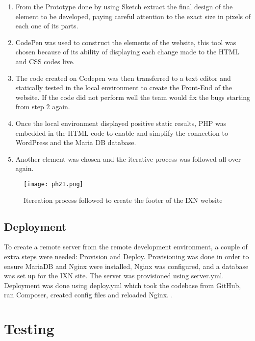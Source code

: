 \documentclass[fontsize=11pt]{extarticle}
\numberwithin{figure}{section} %
\begin{document}
\begin{enumerate}

\item
  From the Prototype done by using Sketch extract the final design of
  the element to be developed, paying careful attention to the exact
  size in pixels of each one of its parts.
\item
  CodePen was used to construct the elements of the website, this tool
  was chosen because of its ability of displaying each change made to
  the HTML and CSS codes live.\\
\item
  The code created on Codepen was then transferred to a text editor and
  statically tested in the local environment to create the Front-End of
  the website. If the code did not perform well the team would fix the
  bugs starting from step 2 again.
\item
  Once the local environment displayed positive static results, PHP was
  embedded in the HTML code to enable and simplify the connection to
  WordPress and the Maria DB database.
\item
  Another element was chosen and the iterative process was followed all
  over again.
\end{enumerate}

\begin{figure}[H]
      \centering
      \texttt{[image: ph21.png]}
      \caption{Itereation process followed to create the footer of the IXN website}
 \end{figure}

\hypertarget{deployment}{%
\subsection{Deployment}\label{deployment}}

To create a remote server from the remote development environment, a
couple of extra steps were needed: Provision and Deploy. Provisioning
was done in order to ensure MariaDB and Nginx were installed, Nginx was
configured, and a database was set up for the IXN site. The server was
provisioned using server.yml. Deployment was done using deploy.yml which
took the codebase from GitHub, ran Composer, created config files and
reloaded Nginx. \cite{p23}.

\hypertarget{testing}{%
\section{Testing}\label{testing}}
\end{document}
